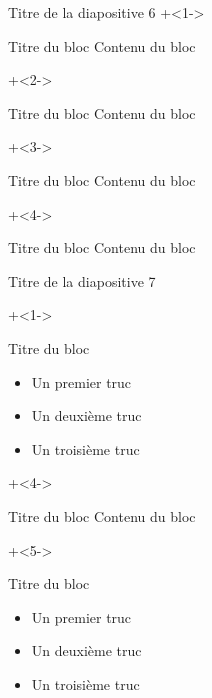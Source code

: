 \documentclass[10pt]{beamer}
\begin{document}
\begin{frame}{Titre de la diapositive 6}
\onslide+<1->

    \begin{block}{Titre du bloc}
        Contenu du bloc
    \end{block}

\onslide+<2->

    \begin{block}{Titre du bloc}
        Contenu du bloc
    \end{block}
\onslide+<3->

    \begin{block}{Titre du bloc}
        Contenu du bloc
    \end{block}

\onslide+<4->

    \begin{block}{Titre du bloc}
        Contenu du bloc
    \end{block}

\end{frame}

\begin{frame}{Titre de la diapositive 7}
    
\onslide+<1->

    \begin{block}{Titre du bloc}
\begin{itemize}[<+- | alert@+>]
      	\item Un premier truc
		\item Un deuxième truc
		\item Un troisième truc
\end{itemize}
    \end{block}
    
\onslide+<4->

    \begin{block}{Titre du bloc}
        Contenu du bloc
    \end{block}
    
    \onslide+<5->

    \begin{block}{Titre du bloc}
\begin{itemize}[<+(1)- | alert@+(1)>]
      	\item Un premier truc
		\item Un deuxième truc
		\item Un troisième truc
\end{itemize}
    \end{block}

\end{frame}
\end{document}
